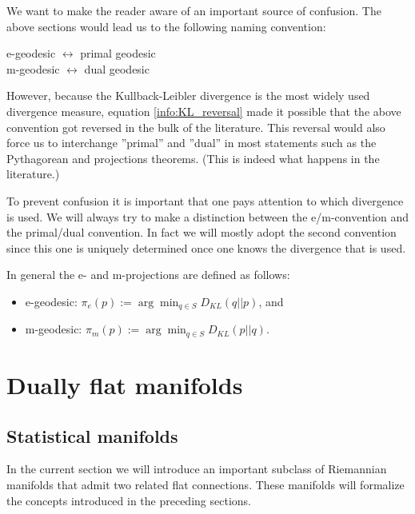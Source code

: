     \begin{remark}
        We want to make the reader aware of an important source of confusion. The above sections would lead us to the following naming convention:
        \begin{center}
            e-geodesic $\leftrightarrow$ primal geodesic\\
            m-geodesic $\leftrightarrow$ dual geodesic
        \end{center}
        However, because the Kullback-Leibler divergence is the most widely used divergence measure, equation \ref{info:KL_reversal} made it possible that the above convention got reversed in the bulk of the literature. This reversal would also force us to interchange ''primal'' and ''dual'' in most statements such as the Pythagorean and projections theorems. (This is indeed what happens in the literature.)

        To prevent confusion it is important that one pays attention to which divergence is used. We will always try to make a distinction between the e/m-convention and the primal/dual convention. In fact we will mostly adopt the second convention since this one is uniquely determined once one knows the divergence that is used.

        In general the e- and m-projections are defined as follows:
        \begin{itemize}
            \item e-geodesic: $\pi_e(p) := \arg\min_{q\in S} D_{KL}(q||p)$, and
            \item m-geodesic: $\pi_m(p) := \arg\min_{q\in S} D_{KL}(p||q)$.
        \end{itemize}
    \end{remark}

\section{Dually flat manifolds}
\subsection{Statistical manifolds}

    In the current section we will introduce an important subclass of Riemannian manifolds that admit two related flat connections. These manifolds will formalize the concepts introduced in the preceding sections.

